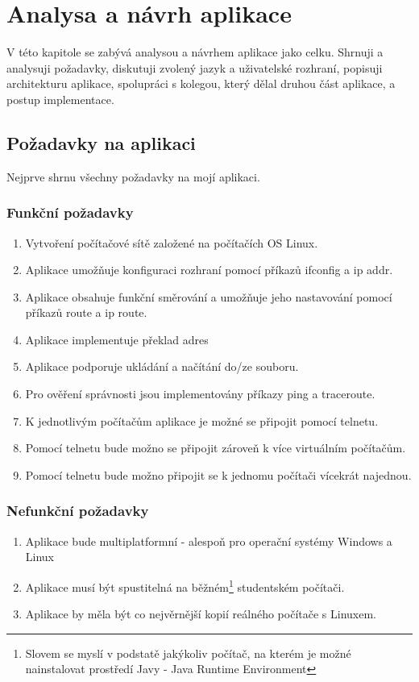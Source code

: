 
\chapter{Analysa a návrh aplikace}

V této kapitole se zabývá analysou a návrhem aplikace jako celku. Shrnuji a analysuji požadavky, diskutuji zvolený jazyk a uživatelské rozhraní, popisuji architekturu aplikace, spolupráci s kolegou, který dělal druhou část aplikace, a postup implementace.


\section{Požadavky na aplikaci}

Nejprve shrnu všechny požadavky na mojí aplikaci.

\subsection{Funkční požadavky}
\begin{enumerate}
 \item Vytvoření počítačové sítě založené na počítačích OS Linux.
 \item Aplikace umožňuje konfiguraci rozhraní pomocí příkazů ifconfig a ip addr.
 \item Aplikace obsahuje funkční směrování a umožňuje jeho nastavování pomocí příkazů route a ip route.
 \item Aplikace implementuje překlad adres
 \item Aplikace podporuje ukládání a načítání do/ze souboru.
 \item Pro ověření správnosti jsou implementovány příkazy ping a traceroute.
 \item K jednotlivým počítačům aplikace je možné se připojit pomocí telnetu.
 \item Pomocí telnetu bude možno se připojit zároveň k více virtuálním počítačům.
 \item Pomocí telnetu bude možno připojit se k jednomu počítači vícekrát najednou.
\end{enumerate}

\subsection{Nefunkční požadavky}
\begin{enumerate}
 \item Aplikace bude multiplatformní - alespoň pro operační systémy Windows a Linux
 \item Aplikace musí být spustitelná na běžném\footnote{Slovem  se myslí v podstatě jakýkoliv počítač, na kterém je možné nainstalovat prostředí Javy - Java Runtime Environment} studentském počítači.
 \item Aplikace by měla být co nejvěrnější kopií reálného počítače s Linuxem.
\end{enumerate}

